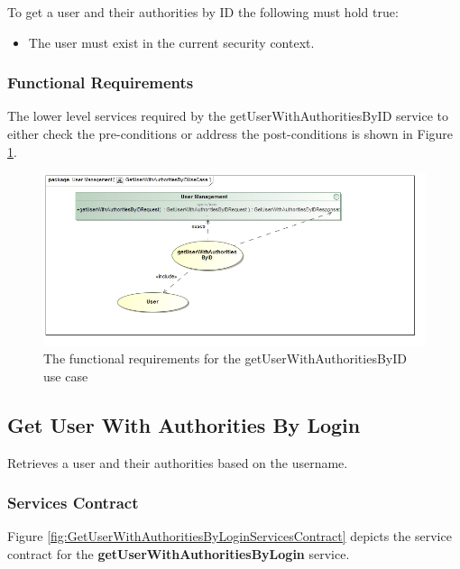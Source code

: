 To get a user and their authorities by ID the following must hold true:
\begin{itemize}
	\item The user must exist in the current security context.
\end{itemize}

\subsubsection{Functional Requirements}
The lower level services required by the getUserWithAuthoritiesByID service to either check the
pre-conditions or address the post-conditions is shown in Figure \ref{getUserWithAuthoritiesByIDUseCase}.

\begin{figure}[H]
	\begin{center}
		\includegraphics[scale=0.5]{../Diagrams and Charts/Users/Get User With Authorities By ID Use Case.jpg}
		\caption{The functional requirements for the getUserWithAuthoritiesByID use case}
		\label{getUserWithAuthoritiesByIDUseCase}
	\end{center}	
\end{figure}

\subsection{Get User With Authorities By Login}
Retrieves a user and their authorities based on the username.

\subsubsection{Services Contract}
Figure \ref{fig:GetUserWithAuthoritiesByLoginServicesContract} depicts the service
contract for the \textbf{getUserWithAuthoritiesByLogin} service.


